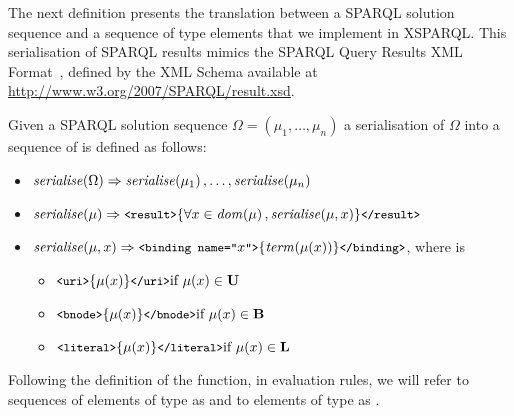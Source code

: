 The next definition presents the translation between a SPARQL solution sequence and a sequence of 
type elements that we implement in XSPARQL.
%
This serialisation of SPARQL results mimics the SPARQL Query Results XML Format~\cite{BeckettBroekstra:2008aa}, defined
by the XML Schema available at {\url{http://www.w3.org/2007/SPARQL/result.xsd}}.
%
\begin{definition}
  \label{lem:solution2types}
  Given a SPARQL solution sequence $\Omega = (\mu_1, \dotsc, \mu_n)$ a serialisation of $\Omega$ into a sequence of
   is defined as follows:
  \begin{itemize}[noitemsep]
  \item $\mathit{serialise}\!\left(\Omega\right) \Rightarrow \mathit{serialise}\!\left(\mu_1\right), \ldots, \mathit{serialise}\!\left(\mu_n\right)$
  \item $\mathit{serialise}\!\left(\mu\right) \Rightarrow 
    \texttt{{\small <result>}} 
    \{\forall x \in \mathit{dom}\!\left(\mu\right), \mathit{serialise}\!\left(\mu, x\right)\}
    \texttt{{\small </result>}}
    $
  \item $\mathit{serialise}\!\left(\mu, x\right) \Rightarrow  
    \texttt{{\small <binding name="}}x\texttt{{\small ">}}
    \{\mathit{term}\!\left(\mathit{\mu}\!\left(x\right)\right)\}
    \texttt{{\small </binding>}}
    $,
    where  is 
    \begin{itemize}[noitemsep]
    \item $\stt{<uri>}\{\mu(x)\}\stt{</uri>} \hfill \textrm{if}~\mu(x) \in \AU$
    \item $\stt{<bnode>}\{\mu(x)\}\stt{</bnode>} \hfill\textrm{if}~\mu(x) \in \AB$
    \item $\stt{<literal>}\{\mu(x)\}\stt{</literal>}\hfill\textrm{if}~\mu(x) \in \AL$
    \end{itemize}

  \end{itemize}
\end{definition}
%
\noindent Following the definition of the  function, in evaluation rules, we will refer to sequences
of elements of type  as \omg{}{} and to elements of type  as \sm{}{}.

